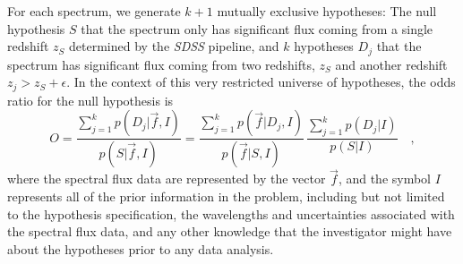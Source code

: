 \documentclass[12pt]{article}
\newcommand{\facility}[1]{\textsl{#1}}
\newcommand{\fluxvec}{\vec{f}}
\begin{document}
For each spectrum, we generate $k+1$ mutually exclusive hypotheses:
The null hypothesis $S$ that the spectrum only has significant flux
coming from a single redshift $z_S$ determined by the \facility{SDSS}
pipeline, and $k$ hypotheses $D_j$ that the spectrum has significant
flux coming from two redshifts, $z_S$ and another redshift
$z_j>z_S+\epsilon$.  In the context of this very restricted universe
of hypotheses, the odds ratio for the null hypothesis is
\begin{equation}
O = \frac{\sum_{j=1}^k p(D_j|\fluxvec,I)}{p(S|\fluxvec,I)}
  = \frac{\sum_{j=1}^k p(\fluxvec|D_j,I)}{p(\fluxvec|S,I)}
  \,\frac{\sum_{j=1}^k p(D_j|I)}{p(S|I)} \quad,
\end{equation}
where the spectral flux data are represented by the vector $\fluxvec$,
and the symbol $I$ represents all of the prior information in the
problem, including but not limited to the hypothesis specification,
the wavelengths and uncertainties associated with the spectral flux
data, and any other knowledge that the investigator might have about
the hypotheses prior to any data analysis.
\end{document}
